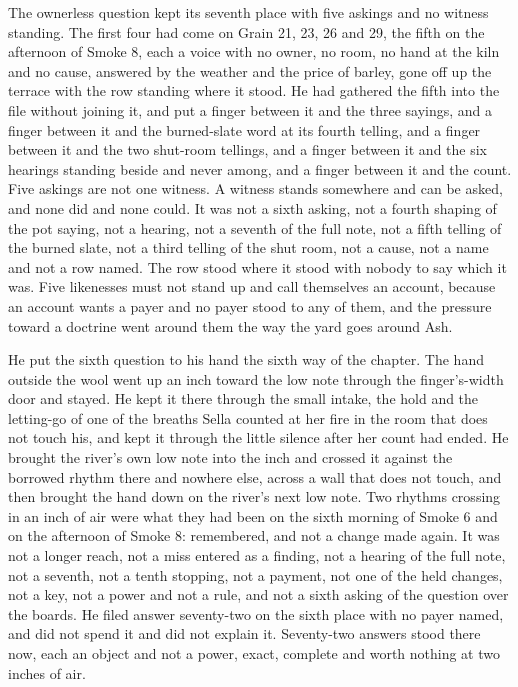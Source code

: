The ownerless question kept its seventh place with five askings and no witness standing. The first four had come on Grain 21, 23, 26 and 29, the fifth on the afternoon of Smoke 8, each a voice with no owner, no room, no hand at the kiln and no cause, answered by the weather and the price of barley, gone off up the terrace with the row standing where it stood. He had gathered the fifth into the file without joining it, and put a finger between it and the three sayings, and a finger between it and the burned-slate word at its fourth telling, and a finger between it and the two shut-room tellings, and a finger between it and the six hearings standing beside and never among, and a finger between it and the count. Five askings are not one witness. A witness stands somewhere and can be asked, and none did and none could. It was not a sixth asking, not a fourth shaping of the pot saying, not a hearing, not a seventh of the full note, not a fifth telling of the burned slate, not a third telling of the shut room, not a cause, not a name and not a row named. The row stood where it stood with nobody to say which it was. Five likenesses must not stand up and call themselves an account, because an account wants a payer and no payer stood to any of them, and the pressure toward a doctrine went around them the way the yard goes around Ash.

He put the sixth question to his hand the sixth way of the chapter. The hand outside the wool went up an inch toward the low note through the finger's-width door and stayed. He kept it there through the small intake, the hold and the letting-go of one of the breaths Sella counted at her fire in the room that does not touch his, and kept it through the little silence after her count had ended. He brought the river's own low note into the inch and crossed it against the borrowed rhythm there and nowhere else, across a wall that does not touch, and then brought the hand down on the river's next low note. Two rhythms crossing in an inch of air were what they had been on the sixth morning of Smoke 6 and on the afternoon of Smoke 8: remembered, and not a change made again. It was not a longer reach, not a miss entered as a finding, not a hearing of the full note, not a seventh, not a tenth stopping, not a payment, not one of the held changes, not a key, not a power and not a rule, and not a sixth asking of the question over the boards. He filed answer seventy-two on the sixth place with no payer named, and did not spend it and did not explain it. Seventy-two answers stood there now, each an object and not a power, exact, complete and worth nothing at two inches of air.

